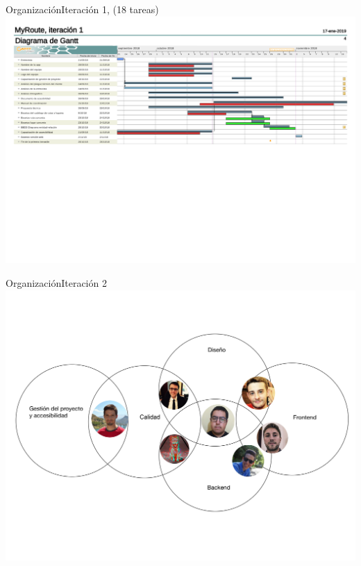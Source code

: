 \documentclass{beamer}
\begin{document}
\begin{frame}{Organizaci\'on}{Iteraci\'on 1, (18 tareas)}
\centering
\hspace{1cm}
\break
\newline
\break
\includegraphics[width=0.8\paperwidth]{images_latex/gantt_itr1}
\end{frame}



\begin{frame}{Organizaci\'on}{Iteraci\'on 2}
\includegraphics[scale=0.1]{images_latex/org_itr2}
\end{frame}
\end{document}
